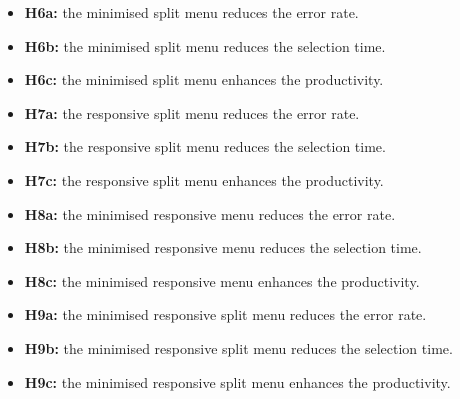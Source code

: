 \begin{itemize}
 \item \textbf{H6a:} the minimised split menu reduces the error rate.
 \item \textbf{H6b:} the minimised split menu reduces the selection time.
 \item \textbf{H6c:} the minimised split menu enhances the 
productivity.\newline
 \item \textbf{H7a:} the responsive split menu reduces the error rate.
 \item \textbf{H7b:} the responsive split menu reduces the selection time.
 \item \textbf{H7c:} the responsive split menu enhances the 
productivity.\newline
 \item \textbf{H8a:} the minimised responsive menu reduces the error rate.
 \item \textbf{H8b:} the minimised responsive menu reduces the selection time.
 \item \textbf{H8c:} the minimised responsive menu enhances the 
productivity.\newline
 \item \textbf{H9a:} the minimised responsive split menu reduces the error 
rate.
 \item \textbf{H9b:} the minimised responsive split menu reduces the selection 
time.
 \item \textbf{H9c:} the minimised responsive split menu enhances the 
productivity.
\end{itemize}
